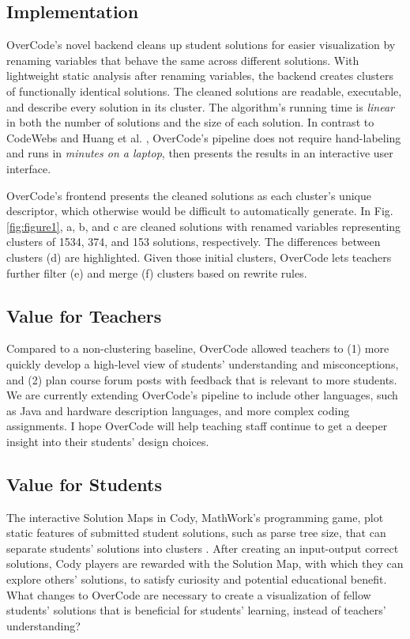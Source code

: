 \documentclass{sigchi}
\begin{document}
\subsection{Implementation}
OverCode's novel backend cleans up student solutions for easier visualization by renaming variables that behave the same across different solutions. With lightweight static analysis after renaming variables, the backend creates clusters of functionally identical solutions. The cleaned solutions are readable, executable, and describe every solution in its cluster. The algorithm's running time is \emph{linear} in both the number of solutions and the size of each solution. In contrast to CodeWebs \cite{codewebs} and Huang et al. \citeyear{MOOCshop}, OverCode's pipeline does not require hand-labeling and runs in \emph{minutes on a laptop}, then presents the results in an interactive user interface.

OverCode's frontend presents the cleaned solutions as each cluster's unique descriptor, which otherwise would be difficult to automatically generate. In Fig. \ref{fig:figure1}, a, b, and c are cleaned solutions with renamed variables representing clusters of 1534, 374, and 153 solutions, respectively. The differences between clusters (d) are highlighted. Given those initial clusters, OverCode lets teachers further filter (e) and merge (f) clusters based on rewrite rules.

\subsection{Value for Teachers}
Compared to a non-clustering baseline, OverCode allowed teachers to (1) more quickly develop a high-level view of students' understanding and misconceptions, and (2) plan course forum posts with feedback that is relevant to more students. We are currently extending OverCode's pipeline to include other languages, such as Java and hardware description languages, and more complex coding assignments. I hope OverCode will help teaching staff continue to get a deeper insight into their students' design choices.

\subsection{Value for Students}
The interactive Solution Maps in Cody, MathWork's programming game, plot static features of submitted student solutions, such as parse tree size, that can separate students' solutions into clusters \cite{ICERGlassman}. After creating an input-output correct solutions, Cody players are rewarded with the Solution Map, with which they can explore others' solutions, to satisfy curiosity and potential educational benefit. What changes to OverCode are necessary to create a visualization of fellow students' solutions that is beneficial for students' learning, instead of teachers' understanding? 
\end{document}
